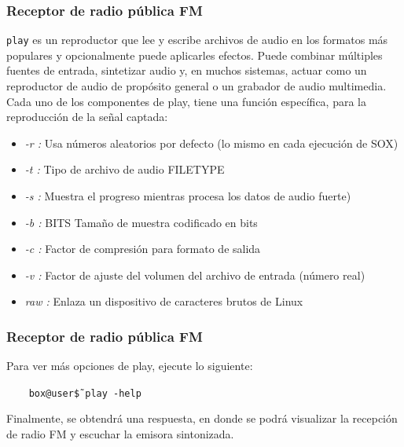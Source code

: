 \begin{frame}
\frametitle{Receptor de radio pública FM}

\texttt{play} es un reproductor que lee y escribe archivos de audio en los formatos más populares y opcionalmente puede aplicarles efectos. Puede combinar múltiples fuentes de entrada, sintetizar audio y, en muchos sistemas, actuar como un reproductor de audio de propósito general o un grabador de audio multimedia. \\
\vspace{2mm }
Cada uno de los componentes de play, tiene una función específica, para la reproducción de la señal captada:

\begin{itemize}
    \item {\textit{-r : } Usa números aleatorios por defecto (lo mismo en cada ejecución de SOX)}
    \item {\textit{-t : } Tipo de archivo de audio FILETYPE}
    \item {\textit{-s : } Muestra el progreso mientras procesa los datos de audio fuerte)}
    \item {\textit{-b : } BITS Tamaño de muestra codificado en bits}
    \item {\textit{-c : } Factor de compresión para formato de salida}
    \item {\textit{-v : } Factor de ajuste del volumen del archivo de entrada (número real)}
    \item {\textit{raw : } Enlaza un dispositivo de caracteres brutos de Linux}
\end{itemize}


\end{frame}

\begin{frame}
\frametitle{Receptor de radio pública FM}

Para ver más opciones de play, ejecute lo siguiente:

\begin{block}{}
  \texttt{
  \ \ \ box@user\~\$ play {-}help}
\end{block} 

Finalmente, se obtendrá una respuesta, en donde se podrá visualizar la recepción de radio FM y escuchar la emisora sintonizada.

\end{frame}

